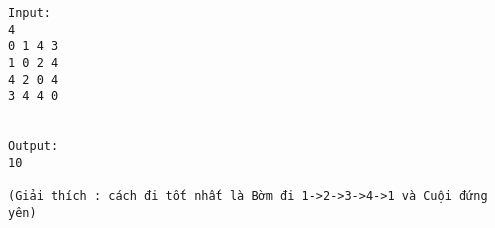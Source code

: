 \begin{verbatim}
Input:
4
0 1 4 3
1 0 2 4
4 2 0 4
3 4 4 0


Output:
10

(Giải thích : cách đi tốt nhất là Bờm đi 1->2->3->4->1 và Cuội đứng yên)
\end{verbatim}